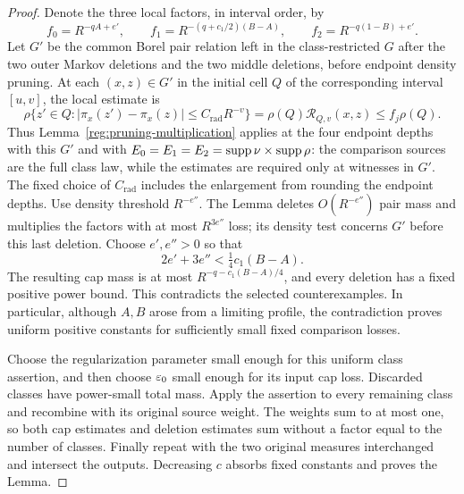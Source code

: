 \begin{proof}
Denote the three local factors, in interval order, by
\[
 f_0=R^{-qA+e'},\qquad
 f_1=R^{-(q+c_1/2)(B-A)},\qquad
 f_2=R^{-q(1-B)+e'}.
\]
Let $G'$ be the common Borel pair relation left in the class-restricted
$G$ after the two outer Markov deletions and the two middle deletions,
before endpoint density pruning. At each $(x,z)\in G'$ in the initial
cell $Q$ of the corresponding interval $[u,v]$, the local estimate is
\[
 \rho\{z'\in Q:
       |\pi_x(z')-\pi_x(z)|\le C_{\mathrm{rad}}R^{-v}\}
 =\rho(Q)\mathcal R_{Q,v}(x,z)\le f_j\rho(Q).
\]
Thus Lemma~\ref{reg:pruning-multiplication} applies at the four
endpoint depths with this $G'$ and with
$E_0=E_1=E_2=\operatorname{supp}\nu\times\operatorname{supp}\rho$: the comparison sources are the
full class law, while the estimates are required only at witnesses in
$G'$. The fixed choice of $C_{\mathrm{rad}}$ includes the enlargement
from rounding the endpoint depths. Use density threshold $R^{-e''}$.
The Lemma deletes
$O(R^{-e''})$ pair mass and multiplies the factors with at most
$R^{3e''}$ loss; its density test concerns $G'$ before this last deletion.
Choose $e',e''>0$ so that
\[
 2e'+3e''<\tfrac14c_1(B-A).
\]
The resulting cap mass is at most
$R^{-q-c_1(B-A)/4}$, and every deletion has a fixed positive
power bound. This contradicts the selected counterexamples. In particular,
although $A,B$ arose from a limiting profile, the contradiction proves
uniform positive constants for sufficiently small fixed comparison losses.

Choose the regularization parameter small enough for this uniform class
assertion, and then choose $\varepsilon_0$ small enough for its input cap
loss. Discarded classes have power-small total mass. Apply the assertion
to every remaining class and recombine with its original source weight.
The weights sum to at most one, so both cap estimates and deletion
estimates sum without a factor equal to the number of classes.
Finally repeat with the two original measures interchanged and intersect
the outputs. Decreasing $c$ absorbs fixed constants and proves the Lemma.
\end{proof}

